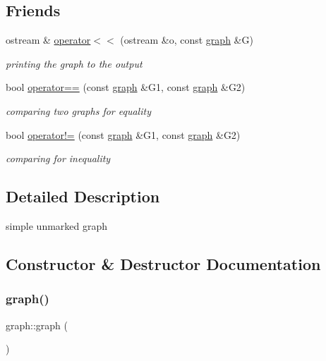 \subsection*{Friends}
\begin{DoxyCompactItemize}
\item 
ostream \& \hyperlink{classgraph_abe8832440fa24b6a6c152dbc3736c908}{operator$<$$<$} (ostream \&o, const \hyperlink{classgraph}{graph} \&G)
\begin{DoxyCompactList}\small\item\em printing the graph to the output \end{DoxyCompactList}\item 
bool \hyperlink{classgraph_a156c8acaca113a7e5cc8d918dd1fc3f3}{operator==} (const \hyperlink{classgraph}{graph} \&G1, const \hyperlink{classgraph}{graph} \&G2)
\begin{DoxyCompactList}\small\item\em comparing two graphs for equality \end{DoxyCompactList}\item 
bool \hyperlink{classgraph_a004e2b491d4bafaf2d8129e6bc8abc2e}{operator!=} (const \hyperlink{classgraph}{graph} \&G1, const \hyperlink{classgraph}{graph} \&G2)
\begin{DoxyCompactList}\small\item\em comparing for inequality \end{DoxyCompactList}\end{DoxyCompactItemize}


\subsection{Detailed Description}
simple unmarked graph 

\subsection{Constructor \& Destructor Documentation}
\mbox{\label{classgraph_a6aaa56b4528d2fdb8f0ecd97e04f6651}} 
\subsubsection{\texorpdfstring{graph()}{graph()}\hspace{0.1cm}{\footnotesize\ttfamily [1/3]}}
{\footnotesize\ttfamily graph\+::graph (\begin{DoxyParamCaption}{ }\end{DoxyParamCaption})\hspace{0.3cm}{\ttfamily [inline]}}



